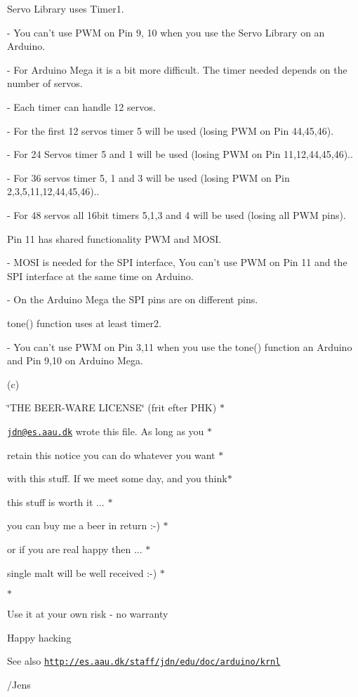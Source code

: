 \begin{DoxyItemize}
\item Servo Library uses Timer1.
\item -\/ You can’t use P\+W\+M on Pin 9, 10 when you use the Servo Library on an Arduino.
\item -\/ For Arduino Mega it is a bit more difficult. The timer needed depends on the number of servos.
\item -\/ Each timer can handle 12 servos.
\item -\/ For the first 12 servos timer 5 will be used (losing P\+W\+M on Pin 44,45,46).
\item -\/ For 24 Servos timer 5 and 1 will be used (losing P\+W\+M on Pin 11,12,44,45,46)..
\item -\/ For 36 servos timer 5, 1 and 3 will be used (losing P\+W\+M on Pin 2,3,5,11,12,44,45,46)..
\item -\/ For 48 servos all 16bit timers 5,1,3 and 4 will be used (losing all P\+W\+M pins).
\item Pin 11 has shared functionality P\+W\+M and M\+O\+S\+I.
\item -\/ M\+O\+S\+I is needed for the S\+P\+I interface, You can’t use P\+W\+M on Pin 11 and the S\+P\+I interface at the same time on Arduino.
\item -\/ On the Arduino Mega the S\+P\+I pins are on different pins.
\item tone() function uses at least timer2.
\item -\/ You can’t use P\+W\+M on Pin 3,11 when you use the tone() function an Arduino and Pin 9,10 on Arduino Mega.
\end{DoxyItemize}

(c)
\begin{DoxyItemize}
\item \char`\"{}\+T\+H\+E B\+E\+E\+R-\/\+W\+A\+R\+E L\+I\+C\+E\+N\+S\+E\char`\"{} (frit efter P\+H\+K) $\ast$
\begin{DoxyItemize}
\item \href{mailto:jdn@es.aau.dk}{\tt jdn@es.\+aau.\+dk} wrote this file. As long as you $\ast$
\item retain this notice you can do whatever you want $\ast$
\item with this stuff. If we meet some day, and you think$\ast$
\item this stuff is worth it ... $\ast$
\item you can buy me a beer in return \+:-\/) $\ast$
\item or if you are real happy then ... $\ast$
\item single malt will be well received \+:-\/) $\ast$
\item $\ast$
\item Use it at your own risk -\/ no warranty
\end{DoxyItemize}
\end{DoxyItemize}

Happy hacking

See also \href{http://es.aau.dk/staff/jdn/edu/doc/arduino/krnl}{\tt http\+://es.\+aau.\+dk/staff/jdn/edu/doc/arduino/krnl}

/\+Jens 